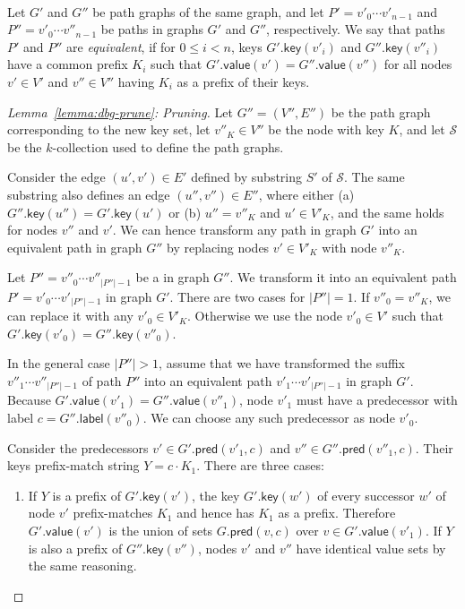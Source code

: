 \documentclass[twoside,leqno,twocolumn]{article}
\newcommand{\abs}[1]{\ensuremath{\lvert #1 \rvert}}
\newcommand{\glabel}{\ensuremath{\mathsf{label}}}
\newcommand{\gpred}{\ensuremath{\mathsf{pred}}}
\newcommand{\gkey}{\ensuremath{\mathsf{key}}}
\newcommand{\gvalue}{\ensuremath{\mathsf{value}}}
\newcommand{\kcollection}[1]{$#1$\nobreakdash-collection}
\begin{document}
\begin{Definition} ~\\
Let $G'$ and $G''$ be path graphs of the same graph, and let $P' = v'_{0} \dotsm v'_{n-1}$ and $P'' = v'_{0} \dotsm v''_{n-1}$ be paths in graphs $G'$ and $G''$, respectively. We say that paths $P'$ and $P''$ are \emph{equivalent}, if for $0 \le i < n$, keys $G'.\gkey(v'_{i})$ and $G''.\gkey(v''_{i})$ have a common prefix $K_{i}$ such that $G'.\gvalue(v') = G''.\gvalue(v'')$ for all nodes $v' \in V'$ and $v'' \in V''$ having $K_{i}$ as a prefix of their keys.
\end{Definition}

\begin{proof}[Lemma~\ref{lemma:dbg-prune}: Pruning]
Let $G'' = (V'', E'')$ be the path graph corresponding to the new key set, let $v''_{K} \in V''$ be the node with key $K$, and let $\mathcal{S}$ be the \kcollection{k} used to define the path graphs.

Consider the edge $(u', v') \in E'$ defined by substring $S'$ of $\mathcal{S}$. The same substring also defines an edge $(u'', v'') \in E''$, where either (a) $G''.\gkey(u'') = G'.\gkey(u')$ or (b) $u'' = v''_{K}$ and $u' \in V'_{K}$, and the same holds for nodes $v''$ and $v'$. We can hence transform any path in graph $G'$ into an equivalent path in graph $G''$ by replacing nodes $v' \in V'_{K}$ with node $v''_{K}$.

Let $P'' = v''_{0} \dotsm v''_{\abs{P''}-1}$ be a in graph $G''$. We transform it into an equivalent path $P' = v'_{0} \dotsm v'_{\abs{P''}-1}$ in graph $G'$. There are two cases for $\abs{P''} = 1$. If $v''_{0} = v''_{K}$, we can replace it with any $v'_{0} \in V'_{K}$. Otherwise we use the node $v'_{0} \in V'$ such that $G'.\gkey(v'_{0}) = G''.\gkey(v''_{0})$.

In the general case $\abs{P''} > 1$, assume that we have transformed the suffix $v''_{1} \dotsm v''_{\abs{P''}-1}$ of path $P''$ into an equivalent path $v'_{1} \dotsm v'_{\abs{P''}-1}$ in graph $G'$. Because $G'.\gvalue(v'_{1}) = G''.\gvalue(v''_{1})$, node $v'_{1}$ must have a predecessor with label $c = G''.\glabel(v''_{0})$. We can choose any such predecessor as node $v'_{0}$.

Consider the predecessors $v' \in G'.\gpred(v'_{1}, c)$ and $v'' \in G''.\gpred(v''_{1}, c)$. Their keys prefix-match string $Y = c \cdot K_{1}$. There are three cases:
\begin{enumerate}
\item If $Y$ is a prefix of $G'.\gkey(v')$, the key $G'.\gkey(w')$ of every successor $w'$ of node $v'$ prefix-matches $K_{1}$ and hence has $K_{1}$ as a prefix. Therefore $G'.\gvalue(v')$ is the union of sets $G.\gpred(v, c)$ over $v \in G'.\gvalue(v'_{1})$. If $Y$ is also a prefix of $G''.\gkey(v'')$, nodes $v'$ and $v''$ have identical value sets by the same reasoning.


\end{enumerate}
\end{proof}
\end{document}
